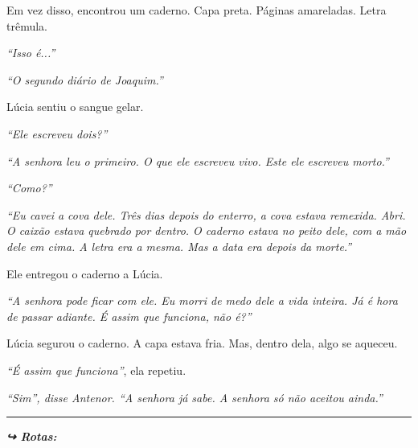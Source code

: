 \noindent Em vez disso, encontrou um caderno. Capa preta. Páginas amareladas. Letra trêmula.

\noindent \textit{\textquotedblleft{}Isso é...\textquotedblright{}}

\noindent \textit{\textquotedblleft{}O segundo diário de Joaquim.\textquotedblright{}}

\noindent Lúcia sentiu o sangue gelar.

\noindent \textit{\textquotedblleft{}Ele escreveu dois?\textquotedblright{}}

\noindent \textit{\textquotedblleft{}A senhora leu o primeiro. O que ele escreveu vivo. Este ele escreveu morto.\textquotedblright{}}

\noindent \textit{\textquotedblleft{}Como?\textquotedblright{}}

\noindent \textit{\textquotedblleft{}Eu cavei a cova dele. Três dias depois do enterro, a cova estava remexida. Abri. O caixão estava quebrado por dentro. O caderno estava no peito dele, com a mão dele em cima. A letra era a mesma. Mas a data era depois da morte.\textquotedblright{}}

\noindent Ele entregou o caderno a Lúcia.

\noindent \textit{\textquotedblleft{}A senhora pode ficar com ele. Eu morri de medo dele a vida inteira. Já é hora de passar adiante. É assim que funciona, não é?\textquotedblright{}}

\noindent Lúcia segurou o caderno. A capa estava fria. Mas, dentro dela, algo se aqueceu.

\noindent \textit{\textquotedblleft{}É assim que funciona\textquotedblright{}}, ela repetiu.

\noindent \textit{\textquotedblleft{}Sim\textquotedblright{}\textit{, disse Antenor. }\textquotedblleft{}A senhora já sabe. A senhora só não aceitou ainda.\textquotedblright{}}

\vspace{0.5em}\noindent\rule{\textwidth}{0.5pt}\vspace{0.5em}

\vspace{0.5em}
\noindent\textit{\textbf{↪ Rotas:}  \rotasep {}}